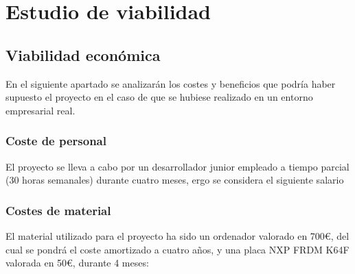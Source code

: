 \section{Estudio de viabilidad}

\subsection{Viabilidad económica}

En el siguiente apartado se analizarán los costes y beneficios que podría haber supuesto el proyecto en el caso de que se hubiese realizado en un entorno empresarial real.

\subsubsection{Coste de personal}

El proyecto se lleva a cabo por un desarrollador junior empleado a tiempo parcial (30 horas semanales) durante cuatro meses, ergo se considera el siguiente salario \cite{web:irpf} \cite{web:irpf2}


\subsubsection{Costes de material}

El material utilizado para el proyecto ha sido un ordenador valorado en 700\euro, del cual se pondrá el coste amortizado a cuatro años, y una placa NXP FRDM K64F valorada en 50\euro, durante 4 meses:


